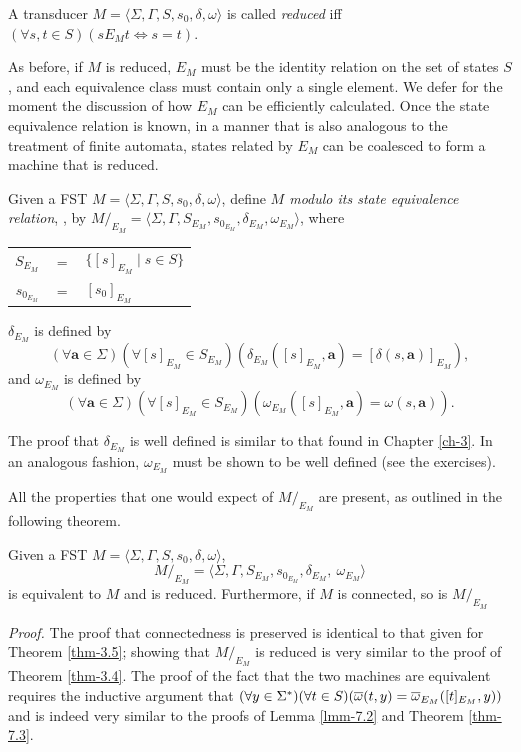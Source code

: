 \begin{dfn}\label{dfn-7.13}
A transducer $M=\langle\Sigma,\Gamma,S,s_0,\delta,\omega\rangle$ is called
\emph{reduced} iff $(\forall s,t \in S)(s E_M t \Leftrightarrow s = t)$.
\end{dfn}

As before, if $M$ is reduced, $E_M$ must be the identity relation on the set of
states $S$, and each equivalence class must contain only a single element. We
defer for  the moment the discussion of how $E_M$ can be efficiently calculated.
Once the state equivalence relation is known, in a manner that is also analogous
to the treatment of finite automata, states related by $E_M$ can be coalesced to
form a machine that is reduced.

\begin{dfn}\label{dfn-7.14}
Given a FST $M=\langle\Sigma,\Gamma,S,s_0,\delta,\omega\rangle$, define
\emph{$M$ modulo its state equivalence relation}, , by
$M/  _{E_M}=\langle\Sigma,\Gamma,S_{E_M},s_{0_{E_M}},\delta_{E_M},\omega_{E_M}
\rangle$, where
\begin{center}\begin{tabular}{rcl}
$S_{E_M}$ & $=$ & $\{[s]_{E_M} \mid s \in S\}$ \\
$s_{0_{E_M}}$ & $=$ & $[s_0]_{E_M}$
\end{tabular}\end{center}
$\delta_{E_M}$ is defined by
\[ (\forall \pmb{a} \in \Sigma)(\forall [s]_{E_M} \in S_{E_M})(\delta_{E_M}([s]_{E_M},
	\pmb{a}) = [\delta(s,\pmb{a})]_{E_M}), \]
and $\omega_{E_M}$ is defined by
\[ (\forall \pmb{a} \in \Sigma)(\forall [s]_{E_M} \in S_{E_M})(\omega_{E_M}([s]_{E_M},
	\pmb{a}) = \omega(s,\pmb{a})). \]
\end{dfn}

The proof that $\delta_{E_M}$ is well defined is similar to that found in
Chapter \ref{ch-3}. In an analogous fashion, $\omega_{E_M}$ must be shown to be well
defined (see the exercises).

All the properties that one would expect of $M/  _{E_M}$ are present, as outlined
in the following theorem.

\begin{thm}\label{thm-7.4}
Given a FST $M=\langle\Sigma,\Gamma,S,s_0,\delta,\omega\rangle$,
\[ M/  _{E_M}= \langle\Sigma,\Gamma,S_{E_M},s_{0_{E_M}},\delta_{E_M},\
	\omega_{E_M}\rangle \]
is equivalent to $M$ and is reduced. Furthermore, if $M$ is connected, so is
$M/  _{E_M}$

\emph{Proof.} The proof that connectedness is preserved is identical to that
given for Theorem \ref{thm-3.5}; showing that $M/  _{E_M}$ is reduced is very similar to the
proof of Theorem \ref{thm-3.4}. The proof of the fact that the two machines are equivalent
requires the inductive argument that $(\forall y \in \Sigma^*)(\forall t \in S)
(\overline{\omega}(t,y) = \overline{\omega}_{E_M}([t]_{E_M},y))$ and is indeed very similar to the proofs
of Lemma \ref{lmm-7.2} and Theorem \ref{thm-7.3}.
\end{thm}

